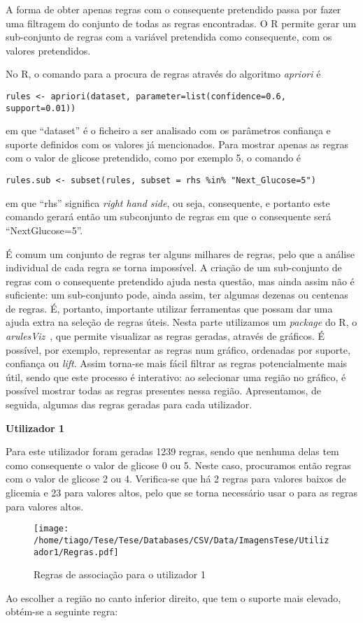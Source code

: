 A forma de obter apenas regras com o consequente pretendido passa por fazer uma filtragem do conjunto de todas as regras encontradas. O R permite gerar um sub-conjunto de regras com a variável pretendida como consequente, com os valores pretendidos.


No R, o comando para a procura de regras através do algoritmo \textit{apriori} é

\begin{lstlisting}
rules <- apriori(dataset, parameter=list(confidence=0.6, support=0.01))
\end{lstlisting}
em que ``dataset'' é o ficheiro a ser analisado com os parâmetros confiança e suporte definidos com os valores já mencionados. Para mostrar apenas as regras com o valor de glicose pretendido, como por exemplo 5, o comando é

\begin{lstlisting}
rules.sub <- subset(rules, subset = rhs %in% "Next_Glucose=5")
\end{lstlisting}
em que ``rhs'' significa \textit{right hand side}, ou seja, consequente, e portanto este comando gerará então um subconjunto de regras em que o consequente será ``Next\textunderscore Glucose=5''.

É comum um conjunto de regras ter alguns milhares de regras, pelo que a análise individual de cada regra se torna impossível. A criação de um sub-conjunto de regras com o consequente pretendido ajuda nesta questão, mas ainda assim não é suficiente: um sub-conjunto pode, ainda assim, ter algumas dezenas ou centenas de regras. É, portanto, importante utilizar ferramentas que possam dar uma ajuda extra na seleção de regras úteis. Nesta parte utilizamos um \textit{package} do R, o \textit{arulesViz}~\cite{arulesviz}, que permite visualizar as regras geradas, através de gráficos. É possível, por exemplo, representar as regras num gráfico, ordenadas por suporte, confiança ou \textit{lift}. Assim torna-se mais fácil filtrar as regras potencialmente mais útil, sendo que este processo é interativo: ao selecionar uma região no gráfico, é possível mostrar todas as regras presentes nessa região. 
Apresentamos, de seguida, algumas das regras geradas para cada utilizador.

\textbf{Utilizador 1}

Para este utilizador foram geradas 1239 regras, sendo que nenhuma delas tem como consequente o valor de glicose 0 ou 5. Neste caso, procuramos então regras com o valor de glicose 2 ou 4. Verifica-se que há 2 regras para valores baixos de glicemia e 23 para valores altos, pelo que se torna necessário usar o  para as regras para valores altos. 
\begin{figure}[H]
\centering
\texttt{[image: /home/tiago/Tese/Tese/Databases/CSV/Data/ImagensTese/Utilizador1/Regras.pdf]}
\caption{Regras de associação para o utilizador 1}
\end{figure}
Ao escolher a região no canto inferior direito, que tem o suporte mais elevado, obtém-se a seguinte regra:

